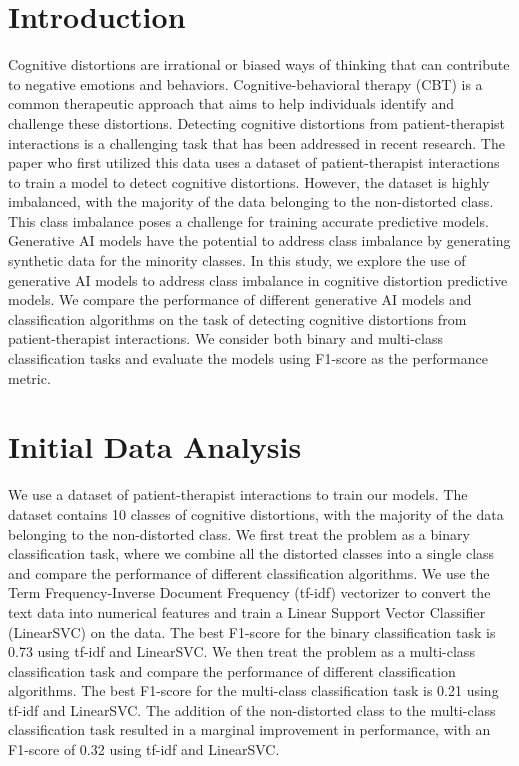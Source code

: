 \documentclass[a0,landscape]{a0poster}
\begin{document}
\begin{multicols}{4}
\color{Teal}

\section*{Introduction}
\color{Black}

Cognitive distortions are irrational or biased ways of thinking that can contribute to negative emotions and behaviors. Cognitive-behavioral therapy (CBT) is a common therapeutic approach that aims to help individuals identify and challenge these distortions. Detecting cognitive distortions from patient-therapist interactions is a challenging task that has been addressed in recent research. The paper who first utilized this data\cite{original_paper} uses a dataset of patient-therapist interactions to train a model to detect cognitive distortions. However, the dataset is highly imbalanced, with the majority of the data belonging to the non-distorted class. This class imbalance poses a challenge for training accurate predictive models. Generative AI models have the potential to address class imbalance by generating synthetic data for the minority classes. In this study, we explore the use of generative AI models to address class imbalance in cognitive distortion predictive models. We compare the performance of different generative AI models and classification algorithms on the task of detecting cognitive distortions from patient-therapist interactions. We consider both binary and multi-class classification tasks and evaluate the models using F1-score as the performance metric.

\color{Teal}
\section*{Initial Data Analysis}
\color{Black}

We use a dataset of patient-therapist interactions to train our models. The dataset contains 10 classes of cognitive distortions, with the majority of the data belonging to the non-distorted class. We first treat the problem as a binary classification task, where we combine all the distorted classes into a single class and compare the performance of different classification algorithms. We use the Term Frequency-Inverse Document Frequency (tf-idf) vectorizer to convert the text data into numerical features and train a Linear Support Vector Classifier (LinearSVC) on the data. The best F1-score for the binary classification task is 0.73 using tf-idf and LinearSVC. We then treat the problem as a multi-class classification task and compare the performance of different classification algorithms. The best F1-score for the multi-class classification task is 0.21 using tf-idf and LinearSVC. The addition of the non-distorted class to the multi-class classification task resulted in a marginal improvement in performance, with an F1-score of 0.32 using tf-idf and LinearSVC.


\end{multicols}
\end{document}
